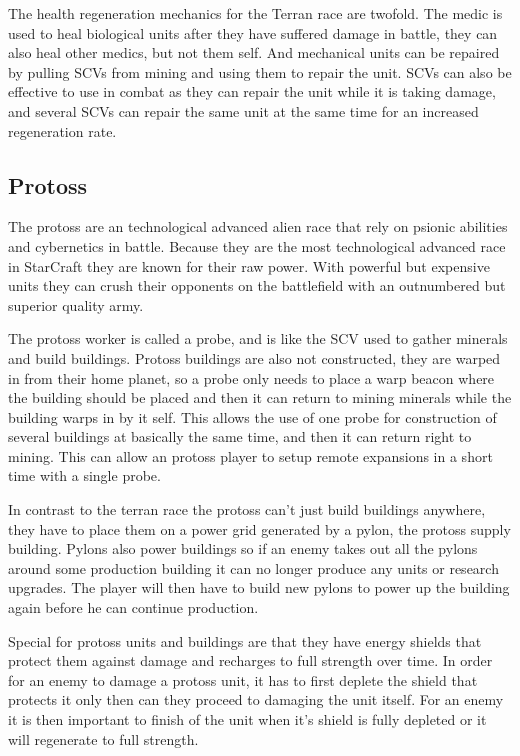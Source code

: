 The health regeneration mechanics for the Terran race are twofold. The medic is used to heal biological units after they have suffered damage in battle, they can also heal other medics, but not them self. And mechanical units can be repaired by pulling SCVs from mining and using them to repair the unit. SCVs can also be effective to use in combat as they can repair the unit while it is taking damage, and several SCVs can repair the same unit at the same time for an increased regeneration rate. 

\subsection{Protoss}
The protoss are an technological advanced alien race that rely on psionic abilities and cybernetics in battle. Because they are the most technological advanced race in StarCraft they are known for their raw power. With powerful but expensive units they can crush their opponents on the battlefield with an outnumbered but superior quality army.

The protoss worker is called a probe, and is like the SCV used to gather minerals and build buildings. Protoss buildings are also not constructed, they are warped in from their home planet, so a probe only needs to place a warp beacon where the building should be placed and then it can return to mining minerals while the building warps in by it self. This allows the use of one probe for construction of several buildings at basically the same time, and then it can return right to mining. This can allow an protoss player to setup remote expansions in a short time with a single probe. 

In contrast to the terran race the protoss can't just build buildings anywhere, they have to place them on a power grid generated by a pylon, the protoss supply building. Pylons also power buildings so if an enemy takes out all the pylons around some production building it can no longer produce any units or research upgrades. The player will then have to build new pylons to power up the building again before he can continue production. 

Special for protoss units and buildings are that they have energy shields that protect them against damage and recharges to full strength over time. In order for an enemy to damage a protoss unit, it has to first deplete the shield that protects it only then can they proceed to damaging the unit itself. For an enemy it is then important to finish of the unit when it's shield is fully depleted or it will regenerate to full strength. 

